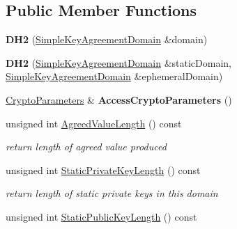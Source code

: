 \subsection*{Public Member Functions}
\begin{DoxyCompactItemize}
\item 
\hypertarget{class_d_h2_ae2ee7e416b765879cb9b8066701baca6}{
{\bfseries DH2} (\hyperlink{class_simple_key_agreement_domain}{SimpleKeyAgreementDomain} \&domain)}
\label{class_d_h2_ae2ee7e416b765879cb9b8066701baca6}

\item 
\hypertarget{class_d_h2_a3d28d61071631a9d2d187c01984fa8de}{
{\bfseries DH2} (\hyperlink{class_simple_key_agreement_domain}{SimpleKeyAgreementDomain} \&staticDomain, \hyperlink{class_simple_key_agreement_domain}{SimpleKeyAgreementDomain} \&ephemeralDomain)}
\label{class_d_h2_a3d28d61071631a9d2d187c01984fa8de}

\item 
\hypertarget{class_d_h2_a8873541aa29f886dc4c38c183e231bac}{
\hyperlink{class_crypto_parameters}{CryptoParameters} \& {\bfseries AccessCryptoParameters} ()}
\label{class_d_h2_a8873541aa29f886dc4c38c183e231bac}

\item 
\hypertarget{class_d_h2_a403d4258cc4c99fb00c921a7e85de660}{
unsigned int \hyperlink{class_d_h2_a403d4258cc4c99fb00c921a7e85de660}{AgreedValueLength} () const }
\label{class_d_h2_a403d4258cc4c99fb00c921a7e85de660}

\begin{DoxyCompactList}\small\item\em return length of agreed value produced \item\end{DoxyCompactList}\item 
\hypertarget{class_d_h2_aed4126a3c1c6dc8c800ca7802e12f8f9}{
unsigned int \hyperlink{class_d_h2_aed4126a3c1c6dc8c800ca7802e12f8f9}{StaticPrivateKeyLength} () const }
\label{class_d_h2_aed4126a3c1c6dc8c800ca7802e12f8f9}

\begin{DoxyCompactList}\small\item\em return length of static private keys in this domain \item\end{DoxyCompactList}\item 
\hypertarget{class_d_h2_ac4f0631532ad65475f53dd3710c6901c}{
unsigned int \hyperlink{class_d_h2_ac4f0631532ad65475f53dd3710c6901c}{StaticPublicKeyLength} () const }
\label{class_d_h2_ac4f0631532ad65475f53dd3710c6901c}


\end{DoxyCompactItemize}
